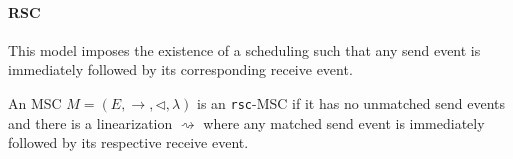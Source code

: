 \paragraph{RSC}
This model imposes the existence of a scheduling such that any send event is 
immediately followed by its corresponding receive event.

An MSC $M = (E, \to, \lhd, \lambda)$ is an \verb|rsc|-MSC if it has no unmatched 
send events and there is a linearization $\rightsquigarrow$ where any 
matched send event is immediately followed by its respective receive event.